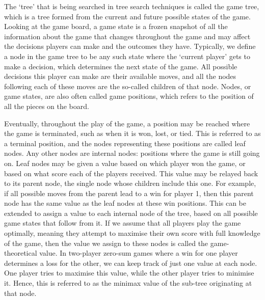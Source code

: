 The `tree’ that is being searched in tree search techniques is called the game tree, which is a tree formed from the current and future possible states of the game. Looking at the game board, a game state is a frozen snapshot of all the information about the game that changes throughout the game and may affect the decisions players can make and the outcomes they have. Typically, we define a node in the game tree to be any such state where the `current player’ gets to make a decision, which determines the next state of the game. All possible decisions this player can make are their available moves, and all the nodes following each of these moves are the so-called children of that node. Nodes, or game states, are also often called game positions, which refers to the position of all the pieces on the board.

Eventually, throughout the play of the game, a position may be reached where the game is terminated, such as when it is won, lost, or tied. This is referred to as a terminal position, and the nodes representing these positions are called leaf nodes. Any other nodes are internal nodes: positions where the game is still going on. Leaf nodes may be given a value based on which player won the game, or based on what score each of the players received. This value may be relayed back to its parent node, the single node whose children include this one. For example, if all possible moves from the parent lead to a win for player 1, then this parent node has the same value as the leaf nodes at these win positions. This can be extended to assign a value to each internal node of the tree, based on all possible game states that follow from it. If we assume that all players play the game optimally, meaning they attempt to maximise their own score with full knowledge of the game, then the value we assign to these nodes is called the game-theoretical value. In two-player zero-sum games where a win for one player determines a loss for the other, we can keep track of just one value at each node. One player tries to maximise this value, while the other player tries to minimise it. Hence, this is referred to as the minimax value of the sub-tree originating at that node.

